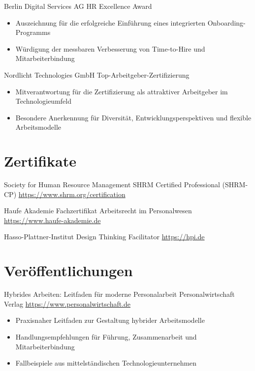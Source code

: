 \documentclass[a4paper, serif, 10pt]{moderncv}
\begin{document}
        {Berlin Digital Services AG}
        {HR Excellence Award}
        {}
        {}
        {\begin{itemize}
\item Auszeichnung für die erfolgreiche Einführung eines integrierten Onboarding-Programms
\item Würdigung der messbaren Verbesserung von Time-to-Hire und Mitarbeiterbindung
\end{itemize}}

        {Nordlicht Technologies GmbH}
        {Top-Arbeitgeber-Zertifizierung}
        {}
        {}
        {\begin{itemize}
\item Mitverantwortung für die Zertifizierung als attraktiver Arbeitgeber im Technologieumfeld
\item Besondere Anerkennung für Diversität, Entwicklungsperspektiven und flexible Arbeitsmodelle
\end{itemize}}
\section{Zertifikate}

        {Society for Human Resource Management}
        {SHRM Certified Professional (SHRM-CP)}
        {\url{https://www.shrm.org/certification}}
        {}
        {}

        {Haufe Akademie}
        {Fachzertifikat Arbeitsrecht im Personalwesen}
        {\url{https://www.haufe-akademie.de}}
        {}
        {}

        {Hasso-Plattner-Institut}
        {Design Thinking Facilitator}
        {\url{https://hpi.de}}
        {}
        {}
\section{Veröffentlichungen}

        {Hybrides Arbeiten: Leitfaden für moderne Personalarbeit}
        {Personalwirtschaft Verlag}
        {\url{https://www.personalwirtschaft.de}}
        {}
        {\begin{itemize}
\item Praxisnaher Leitfaden zur Gestaltung hybrider Arbeitsmodelle
\item Handlungsempfehlungen für Führung, Zusammenarbeit und Mitarbeiterbindung
\item Fallbeispiele aus mittelständischen Technologieunternehmen
\end{itemize}}
\end{document}
